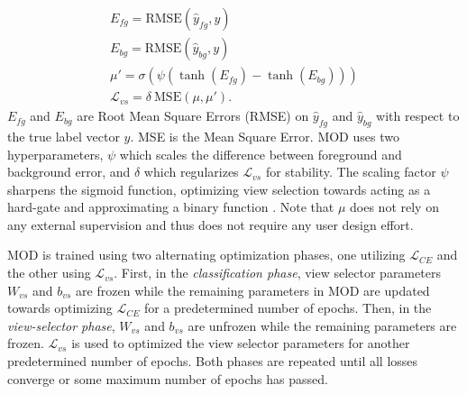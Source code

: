 \begin{equation}
\begin{aligned}
    E_{fg} = \text{RMSE}(\hat{y}_{fg}, y) \\
    E_{bg} = \text{RMSE}(\hat{y}_{bg}, y) \\
    \mu' = \sigma(\psi (\tanh(E_{fg}) - \tanh(E_{bg}))) \\
    \mathcal{L}_{vs} = \delta ~\text{MSE}(\mu, \mu').
\end{aligned}
\end{equation}
$E_{fg}$ and $E_{bg}$ are Root Mean Square Errors (RMSE) on $\hat{y}_{fg}$ and $\hat{y}_{bg}$ with respect to the true label vector $y$. MSE is the Mean Square Error. MOD uses two hyperparameters, $\psi$ which scales the difference between foreground and background error, and $\delta$ which regularizes $\mathcal{L}_{vs}$ for stability. The scaling factor $\psi$ sharpens the sigmoid function, optimizing view selection towards acting as a hard-gate and approximating a binary function \cite{mcculloch1943logical,fernando2017pathnet,serra2018overcoming}. Note that $\mu$ does not rely on any external supervision and thus does not require any user design effort.

MOD is trained using two alternating optimization phases, one utilizing $\mathcal{L}_{CE}$ and the other using $\mathcal{L}_{vs}$. First, in the \emph{classification phase}, view selector parameters $W_{vs}$ and $b_{vs}$ are frozen while the remaining parameters in MOD are updated towards optimizing $\mathcal{L}_{CE}$ for a predetermined number of epochs. Then, in the \emph{view-selector phase}, $W_{vs}$ and $b_{vs}$ are unfrozen while the remaining parameters are frozen. $\mathcal{L}_{vs}$ is used to optimized the view selector parameters for another predetermined number of epochs. Both phases are repeated until all losses converge or some maximum number of epochs has passed.

